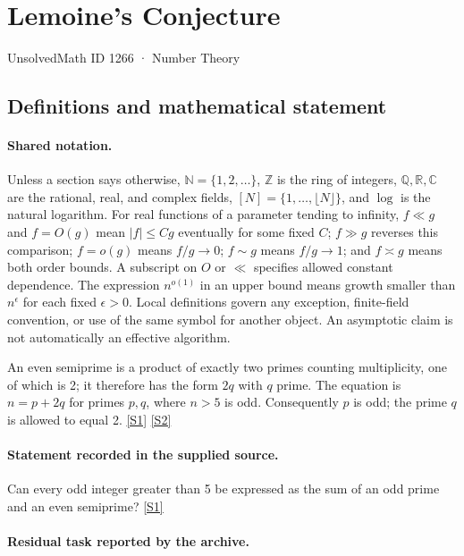 \documentclass[11pt,a4paper]{article}
\newcommand{\N}{\mathbb{N}}
\newcommand{\Z}{\mathbb{Z}}
\newcommand{\Q}{\mathbb{Q}}
\newcommand{\R}{\mathbb{R}}
\newcommand{\C}{\mathbb{C}}
\newcommand{\sref}[2]{\hyperlink{source:#1:#2}{[S#2]}}
\begin{document}

\setcounter{section}{1265}

\section{Lemoine's Conjecture}\label{1266}

{\small\sffamily UnsolvedMath ID 1266 · Number Theory}

\subsection{Definitions and mathematical statement}

\paragraph{Shared notation.}Unless a section says otherwise, $\N=\{1,2,\ldots\}$,
$\Z$ is the ring of integers, $\Q,\R,\C$ are the rational, real, and complex
fields, $[N]=\{1,\ldots,\lfloor N\rfloor\}$, and $\log$ is the natural
logarithm. For real functions of a parameter tending to infinity,
$f\ll g$ and $f=O(g)$ mean $|f|\leq Cg$ eventually for some fixed $C$;
$f\gg g$ reverses this comparison; $f=o(g)$ means $f/g\to0$;
$f\sim g$ means $f/g\to1$; and $f\asymp g$ means both order bounds.
A subscript on $O$ or $\ll$ specifies allowed constant dependence.
The expression $n^{o(1)}$ in an upper bound means growth smaller than
$n^\epsilon$ for each fixed $\epsilon>0$. Local definitions govern any
exception, finite-field convention, or use of the same symbol for another
object. An asymptotic claim is not automatically an effective algorithm.



An even semiprime is a product of exactly two primes counting multiplicity, one of which is 2; it therefore has the form $2q$ with $q$ prime. The equation is $n=p+2q$ for primes $p,q$, where $n>5$ is odd. Consequently $p$ is odd; the prime $q$ is allowed to equal 2. \sref{1266}{1} \sref{1266}{2}

\paragraph{Statement recorded in the supplied source.}
Can every odd integer greater than 5 be expressed as the sum of an odd prime and an even semiprime? \sref{1266}{1}

\paragraph{Residual task reported by the archive.}
\end{document}
